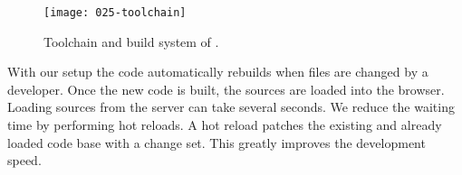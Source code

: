 \documentclass[../ClassicThesis.tex]{subfiles}
\begin{document}
\begin{figure}[h]
  \centering
  \texttt{[image: 025-toolchain]}
  \caption{Toolchain and build system of {\platener}.}
  \label{fig:toolchain}
\end{figure}

With our setup the code automatically rebuilds when files
are changed by a developer. Once the new code is built, the
sources are loaded into the browser. Loading sources from
the server can take several seconds. We reduce the waiting
time by performing hot reloads. A hot reload patches the
existing and already loaded code base with a change set.
This greatly improves the development speed.









\end{document}
